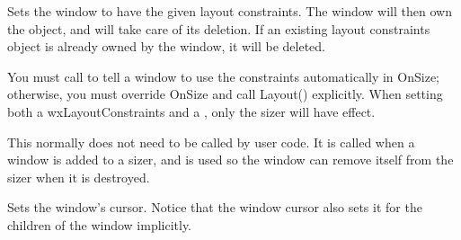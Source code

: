 




\label{wxwindowsetconstraints}


Sets the window to have the given layout constraints. The window
will then own the object, and will take care of its deletion.
If an existing layout constraints object is already owned by the
window, it will be deleted.




You must call  to tell a window to use
the constraints automatically in OnSize; otherwise, you must override OnSize and call Layout()
explicitly. When setting both a wxLayoutConstraints and a , only the
sizer will have effect.

\label{wxwindowsetcontainingsizer}


This normally does not need to be called by user code.  It is called
when a window is added to a sizer, and is used so the window can
remove itself from the sizer when it is destroyed.


\label{wxwindowsetcursor}


Sets the window's cursor. Notice that the window cursor also sets it for the
children of the window implicitly.

